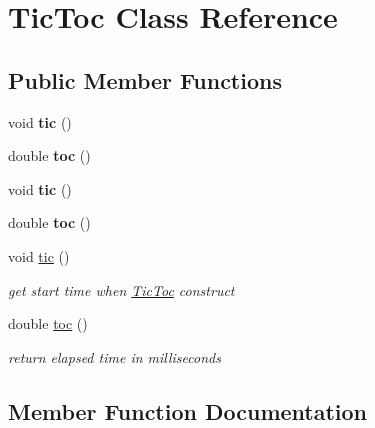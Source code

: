 \hypertarget{classTicToc}{}\section{Tic\+Toc Class Reference}
\label{classTicToc}
\subsection*{Public Member Functions}
\begin{DoxyCompactItemize}
\item 
\mbox{\label{classTicToc_a5d76802851d3cbc366b4ccccb7257e2e}} 
void {\bfseries tic} ()
\item 
\mbox{\label{classTicToc_a10182e0061b91019467a8fa37089210e}} 
double {\bfseries toc} ()
\item 
\mbox{\label{classTicToc_a5d76802851d3cbc366b4ccccb7257e2e}} 
void {\bfseries tic} ()
\item 
\mbox{\label{classTicToc_a10182e0061b91019467a8fa37089210e}} 
double {\bfseries toc} ()
\item 
\mbox{\label{classTicToc_a5d76802851d3cbc366b4ccccb7257e2e}} 
void \hyperlink{classTicToc_a5d76802851d3cbc366b4ccccb7257e2e}{tic} ()
\begin{DoxyCompactList}\small\item\em get start time when \hyperlink{classTicToc}{Tic\+Toc} construct \end{DoxyCompactList}\item 
double \hyperlink{classTicToc_a10182e0061b91019467a8fa37089210e}{toc} ()
\begin{DoxyCompactList}\small\item\em return elapsed time in milliseconds \end{DoxyCompactList}\end{DoxyCompactItemize}


\subsection{Member Function Documentation}
\mbox{\label{classTicToc_a10182e0061b91019467a8fa37089210e}} 
